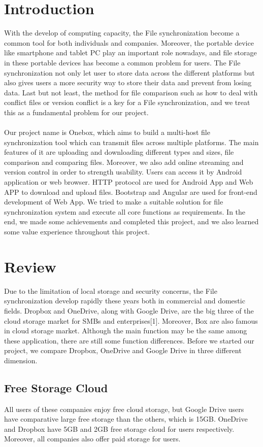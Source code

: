 \documentclass[12pt,a4]{article}
\begin{document}
\section{Introduction}\label{Introduction}
With the develop of computing capacity, the File synchronization become a common tool for both individuals and companies. Moreover, the portable device like smartphone and tablet PC play an important role nowadays, and file storage in these portable devices has become a common problem for users. The File synchronization not only let user to store data across the different platforms but also gives users a more security way to store their data and prevent from losing data. Last but not least, the method for file comparison such as how to deal with conflict files or version conflict is a key for a File synchronization, and we treat this as a fundamental problem for our project.\\
\\
Our project name is Onebox, which aims to build a multi-host file synchronization tool which can transmit files across multiple platforms. The main features of it are  uploading and downloading different types and sizes, file comparison and comparing files. Moreover, we also add online streaming and version control in order to strength usability. Users can access it by Android application or web browser.  HTTP protocol are used for Android App and Web APP to download and upload files. Bootstrap and Angular are used for front-end development of Web App. We tried to make a suitable solution for file synchronization system and execute all core functions as requirements. In the end, we made some achievements and completed this project, and we also learned some value experience throughout this project.


\section{Review}\label{Section-Frameworks}
Due to the limitation of local storage and security concerns, the File synchronization develop rapidly these years both in commercial and domestic fields. Dropbox and OneDrive, along with Google Drive, are the big three of the cloud storage market for SMBs and enterprises[1]. Moreover, Box are also famous in cloud storage market. Although the main function may be the same among these application, there are still some function differences. Before we started our project, we compare Dropbox, OneDrive and Google Drive in three different dimension.
\subsection{Free Storage Cloud}\label{SubSec-Value}	
All users of these companies enjoy free cloud storage, but Google Drive users have comparative large free storage than the others, which is 15GB. OneDrive and Dropbox have 5GB and 2GB free storage cloud for users respectively. Moreover, all companies also offer paid storage for users. 
\end{document}
